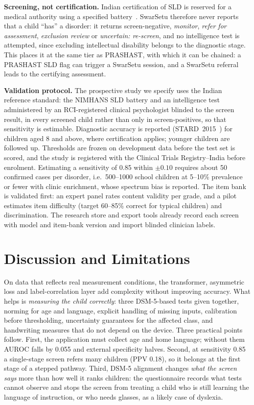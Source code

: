 \documentclass[conference]{IEEEtran}
\begin{document}
\textbf{Screening, not certification.} Indian certification of SLD is reserved for a medical authority using a specified battery~\cite{depwd2018}. SwarSetu therefore never reports that a child ``has'' a disorder: it returns screen-negative, \emph{monitor}, \emph{refer for assessment}, \emph{exclusion review} or \emph{uncertain: re-screen}, and no intelligence test is attempted, since excluding intellectual disability belongs to the diagnostic stage. This places it at the same tier as PRASHAST, with which it can be chained: a PRASHAST SLD flag can trigger a SwarSetu session, and a SwarSetu referral leads to the certifying assessment.

\textbf{Validation protocol.} The prospective study we specify uses the Indian reference standard: the NIMHANS SLD battery and an intelligence test administered by an RCI-registered clinical psychologist blinded to the screen result, in every screened child rather than only in screen-positives, so that sensitivity is estimable. Diagnostic accuracy is reported (STARD~2015~\cite{stard2015}) for children aged 8 and above, where certification applies; younger children are followed up. Thresholds are frozen on development data before the test set is scored, and the study is registered with the Clinical Trials Registry--India before enrolment. Estimating a sensitivity of 0.85 within $\pm0.10$ requires about 50 confirmed cases per disorder, i.e.\ 500--1000 school children at 5--10\% prevalence or fewer with clinic enrichment, whose spectrum bias is reported. The item bank is validated first: an expert panel rates content validity per grade, and a pilot estimates item difficulty (target 60--85\% correct for typical children) and discrimination. The research store and export tools already record each screen with model and item-bank version and import blinded clinician labels.

\section{Discussion and Limitations}\label{sec:discussion}
On data that reflects real measurement conditions, the transformer, asymmetric loss and label-correlation layer add complexity without improving accuracy. What helps is \emph{measuring the child correctly}: three DSM-5-based tests given together, norming for age and language, explicit handling of missing inputs, calibration before thresholding, uncertainty guarantees for the affected class, and handwriting measures that do not depend on the device. Three practical points follow. First, the application must collect age and home language; without them AUROC falls by 0.055 and external specificity halves. Second, at sensitivity 0.85 a single-stage screen refers many children (PPV 0.18), so it belongs at the first stage of a stepped pathway. Third, DSM-5 alignment changes \emph{what the screen says} more than how well it ranks children: the questionnaire records what tests cannot observe and stops the screen from treating a child who is still learning the language of instruction, or who needs glasses, as a likely case of dyslexia.
\end{document}

